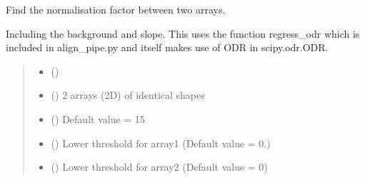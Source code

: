 \documentclass[letterpaper,10pt,english]{sphinxmanual}
\begin{document}
\begin{fulllineitems}
\label{\detokenize{api/pymusepipe:pymusepipe.util_image.get_polynorm}}
\pysigstartsignatures
{}
\pysigstopsignatures
\sphinxAtStartPar
Find the normalisation factor between two arrays.

\sphinxAtStartPar
Including the background and slope. This uses the function
regress\_odr which is included in align\_pipe.py and itself
makes use of ODR in scipy.odr.ODR.
\begin{quote}\begin{description}
\begin{itemize}
\item {} 
\sphinxAtStartPar
{} () \textendash{} 

\item {} 
\sphinxAtStartPar
{} () \textendash{} 2 arrays (2D) of identical shapes

\item {} 
\sphinxAtStartPar
{} () \textendash{} Default value = 15

\item {} 
\sphinxAtStartPar
{} () \textendash{} Lower threshold for array1 (Default value = 0.)

\item {} 
\sphinxAtStartPar
{} () \textendash{} Lower threshold for array2 (Default value = 0)


\end{itemize}
\end{description}
\end{quote}
\end{fulllineitems}
\end{document}
